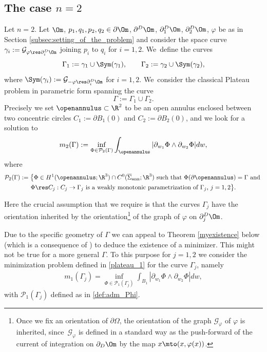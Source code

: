 \subsection{The case $n=2$}\label{sec:the_case_n=2}
Let $n=2$. Let $\Om$, $p_1,q_1,p_2,q_2\in\partial\Om$, $\partial^D\Om$, $\partial_1^D\Om$, $\partial_2^D\Om$, $\varphi$ be as in Section \ref{subsec:setting_of_the_problem} and
consider the space curve $\gamma_i:=\mathcal{G}_{\varphi\res\partial_i^D\Om}$ joining $p_i$ to $q_i$ for $i=1,2$. We~define the curves
\begin{equation*}
\Gamma_1:=\gamma_1\cup\Sym(\gamma_1),\qquad \Gamma_2:=\gamma_2\cup\Sym(\gamma_2),
\end{equation*}
where $\Sym(\gamma_i):=\mathcal{G}_{-\varphi\res\partial_i^D\Om}$ for $i=1,2$. We~consider the
classical Plateau problem in parametric form spanning the curve
\[
\Gamma:=\Gamma_1\cup\Gamma_2.
\]
Precisely we set $\openannulus\subset\R^2$ to be an open annulus
enclosed between two concentric circles { $C_1:=\partial B_1(0)$ and $C_2:=\partial B_2(0)$},
and we look for a solution to
\begin{equation}\label{catenoid_plateau}
m_2(\Gamma):=\inf_{\Phi\in\mathcal{P}_2(\Gamma)}\int_{\openannulus}|\partial_{w_1}\Phi\wedge\partial_{w_2}\Phi|dw,
\end{equation}
where
\begin{multline*}
\mathcal{P}_2(\Gamma):=\big\{\Phi\in H^1(\openannulus;\R^3)\cap C^0(\overline\Sigma_\mathrm{ann};\R^3) \text{ such that }\Phi(\partial \openannulus)=\Gamma\text{ and }\\
\Phi\res C_j:C_j\to \Gamma_j\text{ is a weakly monotonic parametrization of $\Gamma_j$, $j=1,2$}\big\}.
\end{multline*}

Here the crucial assumption that we require is that the curves $\Gamma_j$
have the orientation inherited by the orientation\footnote{Once we fix
an orientation of $\partial \Omega$, the orientation of the graph
$\mathcal G_\varphi$
of $\varphi$ is inherited, since~$\mathcal G_\varphi$
is defined in a standard way as the push-forward of the current of integration on $\partial_D\Om$ by the map $x\mto(x,\varphi(x))$.} of the graph of $\varphi$ on $\partial_j^D\Om$.

Due to the specific geometry of $\Gamma$ we can appeal to Theorem \ref{myexistence} below (which is a consequence of \cite[Th.\,1 \& Th.\,5]{MY}) to deduce the existence of a minimizer. This might not be true for a more general $\Gamma$. To this purpose for $j=1,2$ we consider
the minimization problem defined in \eqref{plateau_1} for the curve $\Gamma_j$, namely
\begin{align}\label{minimizationSigma}
m_1(\Gamma_j)=\inf_{\Phi\in\mathcal{P}_1(\Gamma_j)}\int_{B_1}|\partial_{w_1}\Phi\wedge\partial_{w_2}\Phi|dw,
\end{align}
with $\mathcal{P}_1(\Gamma_j)$ defined as in \eqref{def:adm_Phi}.

